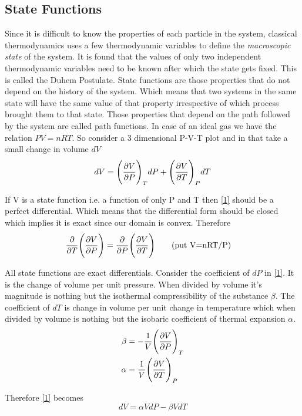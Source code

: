 \documentclass[12pt]{article}
\begin{document}
        \subsection{State Functions}
        Since it is difficult to know the properties of each particle in the system, classical thermodynamics uses a few thermodynamic variables to define the \textit{macroscopic state} of the system. It is found that the values of only two independent thermodynamic variables need to be known after which the state gets fixed. This is called the Duhem Postulate.
        State functions are those properties that do not depend on the history of the system. Which means that two systems in the same state will have the same value of that property irrespective of which process brought them to that state. Those properties that depend on the path followed by the system are called path functions. In case of an ideal gas we have the relation $PV=nRT$. So consider a 3 dimensional P-V-T plot and in that take a small change in volume $dV$
        \begin{equation}
        	dV=\Bigg(\pdv{V}{P}\Bigg)_T dP+\Bigg(\pdv{V}{T}\Bigg)_P dT \label{1}
        \end{equation}
       
        If V is a state function i.e. a function of only P and T then \eqref{1} should be a perfect differential. Which means that the differential form should be closed which implies it is exact since our domain is convex. Therefore
        \begin{equation}
        	\pdv{T}\Bigg(\pdv{V}{P}\Bigg)=\pdv{P}\Bigg(\pdv{V}{T}\Bigg) \quad \qq{(put V=nRT/P)}
        \end{equation}
        
        All state functions are exact differentials. Consider the coefficient of $dP$ in \eqref{1}. It is the change of volume per unit pressure. When divided by volume it's magnitude is nothing but the isothermal compressibility of the substance $\beta$. The coefficient of $dT$ is change in volume per unit change in temperature which when divided by volume is nothing but the isobaric coefficient of thermal expansion $\alpha$.
        \begin{align}
        	\beta&=-\frac{1}{V}\Bigg(\pdv{V}{P}\Bigg)_T \\
        	\alpha &=\frac{1}{V}\Bigg(\pdv{V}{T}\Bigg)_P
        \end{align} 
    
       Therefore \eqref{1} becomes
       \begin{equation}
       	dV=\alpha V dP-\beta V dT
       \end{equation}
       
\end{document}
